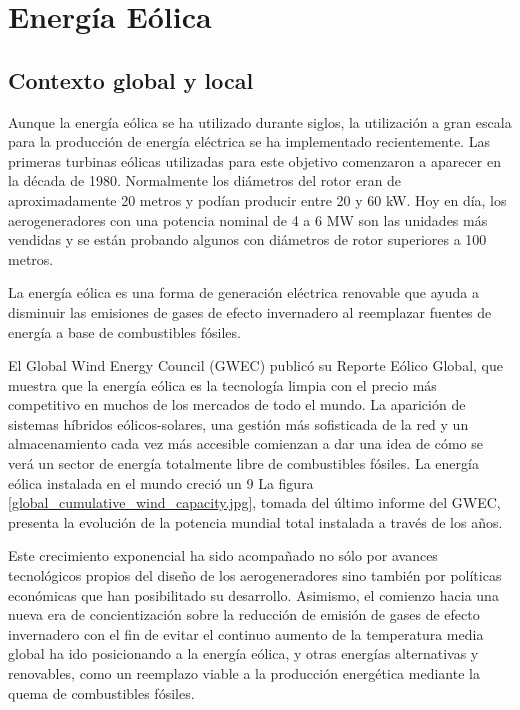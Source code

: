 \chapter{Energía Eólica}\label{EE}

\section{Contexto global y local}




Aunque la energía eólica se ha utilizado durante siglos, la utilización a gran escala para la producción de energía eléctrica se ha implementado recientemente.
Las primeras turbinas eólicas utilizadas para este objetivo comenzaron a aparecer en la década de 1980. Normalmente los diámetros del rotor eran de aproximadamente 20 metros y podían producir entre 20 y 60 kW.
Hoy en día, los aerogeneradores con una potencia nominal de 4 a 6 MW son las unidades más vendidas y se están probando algunos con diámetros de rotor superiores a 100 metros.

La energía eólica es una forma de generación eléctrica renovable que ayuda a disminuir las emisiones de gases de efecto invernadero al reemplazar fuentes de energía a base de combustibles fósiles.

El Global Wind Energy Council (GWEC) publicó su Reporte Eólico Global, que muestra que la energía eólica es la tecnología limpia con el precio más competitivo en muchos de los mercados de todo el mundo. La aparición de sistemas híbridos eólicos-solares, una gestión más  sofisticada de la red y un almacenamiento cada vez más accesible comienzan a dar una idea de cómo se verá un sector de energía totalmente libre de combustibles fósiles.
La energía eólica instalada en el mundo creció un 9%
La figura \ref{global_cumulative_wind_capacity.jpg}, tomada del último informe del GWEC, presenta la evolución de la potencia mundial total instalada a través de los años.

Este crecimiento exponencial ha sido acompañado no sólo por avances tecnológicos propios del diseño de los aerogeneradores sino también por políticas económicas que han posibilitado su desarrollo. Asimismo, el comienzo hacia una nueva era de concientización sobre la reducción de emisión de gases de efecto invernadero con el fin de evitar el continuo aumento de la temperatura media global ha ido posicionando a la energía eólica, y otras energías alternativas y renovables, como un reemplazo viable a la producción energética mediante la quema de combustibles fósiles.

